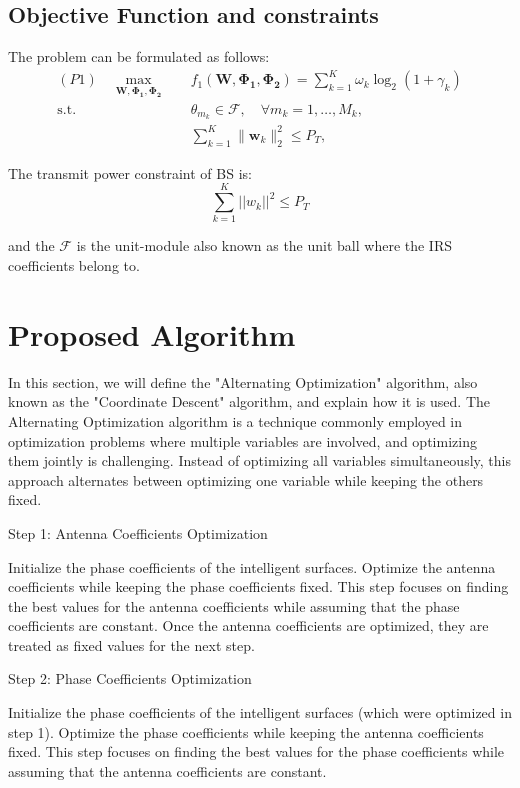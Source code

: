 \documentclass{article}
\begin{document}
\subsection{Objective Function and constraints}
The problem can be formulated as follows:
\begin{align*}
	(P1) \quad \max_{\mathbf{W}, \boldsymbol{\Phi_1}, \boldsymbol{\Phi_2}} \quad & f_1(\mathbf{W}, \boldsymbol{\Phi_1}, \boldsymbol{\Phi_2}) = \sum_{k=1}^{K} \omega_k \log_2(1 + \gamma_k) \\
	\text{s.t.} \quad & \theta_{m_k} \in \mathcal{F}, \quad \forall m_k = 1, \ldots, M_k, \\
	& \sum_{k=1}^{K} \| \mathbf{w}_k \|_2^2 \leq P_T,
\end{align*}

The transmit power constraint of BS is:
\[
\sum_{k=1}^{K} ||w_k||^2 \leq P_T
\]

and the $\mathcal{F}$ is the unit-module also known as the unit ball where the IRS coefficients belong to.

\section{Proposed Algorithm}
In this section, we will define the "Alternating Optimization" algorithm, also known as the "Coordinate Descent" algorithm, and explain how it is used. The Alternating Optimization algorithm is a technique commonly employed in optimization problems where multiple variables are involved, and optimizing them jointly is challenging. Instead of optimizing all variables simultaneously, this approach alternates between optimizing one variable while keeping the others fixed.

Step 1: Antenna Coefficients Optimization

Initialize the phase coefficients of the intelligent surfaces.
Optimize the antenna coefficients while keeping the phase coefficients fixed. This step focuses on finding the best values for the antenna coefficients while assuming that the phase coefficients are constant.
Once the antenna coefficients are optimized, they are treated as fixed values for the next step.

Step 2: Phase Coefficients Optimization

Initialize the phase coefficients of the intelligent surfaces (which were optimized in step 1). Optimize the phase coefficients while keeping the antenna coefficients fixed. This step focuses on finding the best values for the phase coefficients while assuming that the antenna coefficients are constant.
\end{document}
